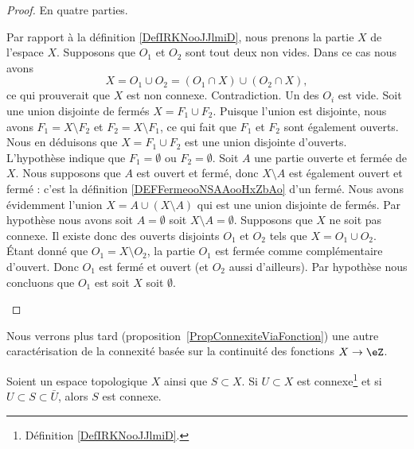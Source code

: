 \begin{proof}
	En quatre parties.
	\begin{subproof}
		Par rapport à la définition \ref{DefIRKNooJJlmiD}, nous prenons la partie \( X\) de l'espace \( X\). Supposons que \( O_1\) et \( O_2\) sont tout deux non vides. Dans ce cas nous avons
		\begin{equation}
			X= O_1\cup O_2 = (O_1\cap X)\cup (O_2\cap X),
		\end{equation}
		ce qui prouverait que \( X\) est non connexe. Contradiction. Un des \( O_i\) est vide.
		Soit une union disjointe de fermés \( X=F_1\cup F_2\). Puisque l'union est disjointe, nous avons \( F_1=X\setminus F_2\) et \( F_2=X\setminus F_1\), ce qui fait que \( F_1\) et \( F_2\) sont également ouverts. Nous en déduisons que \( X=F_1\cup F_2\) est une union disjointe d'ouverts. L'hypothèse indique que \( F_1=\emptyset\) ou \( F_2=\emptyset\).
		Soit \( A\) une partie ouverte et fermée de \( X\). Nous supposons que \( A\) est ouvert et fermé, donc \( X\setminus A\) est également ouvert et fermé : c'est la définition \ref{DEFFermeooNSAAooHxZbAo} d'un fermé. Nous avons évidemment l'union \( X=A\cup(X\setminus A)\) qui est une union disjointe de fermés. Par hypothèse nous avons soit \( A=\emptyset\) soit \( X\setminus A=\emptyset\).
		Supposons que \( X\) ne soit pas connexe. Il existe donc des ouverts disjoints \( O_1\) et \( O_2\) tels que \( X=O_1\cup O_2\). Étant donné que \( O_1=X\setminus O_2\), la partie \( O_1\) est fermée comme complémentaire d'ouvert. Donc \( O_1\) est fermé et ouvert (et \( O_2\) aussi d'ailleurs). Par hypothèse nous concluons que \( O_1\) est soit \( X\) soit \( \emptyset\).
	\end{subproof}
\end{proof}

Nous verrons plus tard (proposition~\ref{PropConnexiteViaFonction}) une autre caractérisation de la connexité basée sur la continuité des fonctions \( X\to \eZ\).

\begin{proposition}     \label{PROPooSCKNooRbewdv}
	Soient un espace topologique \( X\) ainsi que \( S\subset X\). Si \( U\subset X\) est connexe\footnote{Définition \ref{DefIRKNooJJlmiD}.} et si \( U\subset S\subset \bar U\), alors \( S\) est connexe.
\end{proposition}

